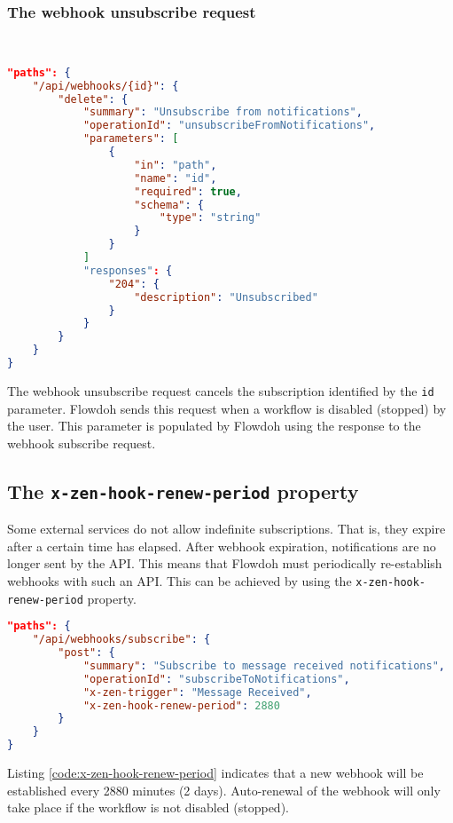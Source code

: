 \subsubsection{The webhook unsubscribe request}
\hfill\\
\begin{minipage}{\textwidth}
\begin{lstlisting}[caption={Webhook unsubscribe request},label={code:webhookunsubscribe},language=json]
"paths": {
    "/api/webhooks/{id}": {
        "delete": {
            "summary": "Unsubscribe from notifications",
            "operationId": "unsubscribeFromNotifications",
            "parameters": [
                {
                    "in": "path",
                    "name": "id",
                    "required": true,
                    "schema": {
                        "type": "string"
                    }
                }
            ]
            "responses": {
                "204": {
                    "description": "Unsubscribed"
                }
            }
        }
    }
}
\end{lstlisting}
\end{minipage}
The webhook unsubscribe request cancels the subscription identified by the \texttt{id} parameter. Flowdoh sends this request when a workflow is disabled (stopped) by the user. This parameter is populated by Flowdoh using the response to the webhook subscribe request.
\subsection{The \texttt{x-zen-hook-renew-period} property}
Some external services do not allow indefinite subscriptions. That is, they expire after a certain time has elapsed. After webhook expiration, notifications are no longer sent by the API. This means that Flowdoh must periodically re-establish webhooks with such an API. This can be achieved by using the \texttt{x-zen-hook-renew-period} property.\\
\begin{minipage}{\textwidth}
\begin{lstlisting}[caption={\texttt{x-zen-hook-renew-period} usage},label={code:x-zen-hook-renew-period},language=json]
"paths": {
    "/api/webhooks/subscribe": {
        "post": {
            "summary": "Subscribe to message received notifications",
            "operationId": "subscribeToNotifications",
            "x-zen-trigger": "Message Received",
            "x-zen-hook-renew-period": 2880
        }
    }
}
\end{lstlisting}
\end{minipage}
Listing \ref{code:x-zen-hook-renew-period} indicates that a new webhook will be established every 2880 minutes (2 days). Auto-renewal of the webhook will only take place if the workflow is not disabled (stopped).
